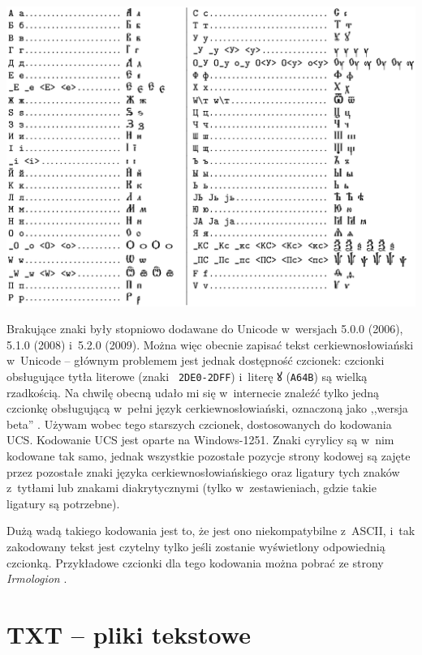 \documentclass{pracamgr}
\begin{document}
\begin{table}[ht!]
  \small
  \caption{Kodowanie znaków cerkiewno\-{}słowiańskich w~standardzie HIP}
  \centering
    \includegraphics[width=\textwidth]{HIP-tabelka.png}
    \label{tab:hip}
\end{table}

Brakujące znaki były stopniowo dodawane do Unicode w~wersjach 5.0.0
(2006), 5.1.0 (2008) i~5.2.0 (2009). Można więc obecnie zapisać tekst
cerkiewno\-{}słowiański w~Unicode -- głównym problemem jest jednak
dostępność czcionek: czcionki obsługujące tytła literowe (znaki {\tt
  2DE0-2DFF}) i~literę {\cyr ꙋ} ({\tt A64B}) są wielką rzadkością. Na
chwilę obecną udało mi się w~internecie znaleźć tylko jedną czcionkę
obsługującą w~pełni język cerkiewno\-{}słowiański, oznaczoną jako
,,wersja beta'' \cite{ponomar}. Używam wobec tego starszych czcionek,
dostosowanych do kodowania UCS. Kodowanie UCS jest oparte na
Windows-1251. Znaki cyrylicy są w~nim kodowane tak samo, jednak
wszystkie pozostałe pozycje strony kodowej są zajęte przez pozostałe
znaki języka cerkiewno\-{}słowiańskiego oraz ligatury tych znaków
z~tytłami lub znakami diakrytycznymi (tylko w~zestawieniach, gdzie takie
ligatury są potrzebne).

Dużą wadą takiego kodowania jest to, że jest ono niekompatybilne
z~ASCII, i~tak zakodowany tekst jest czytelny tylko jeśli zostanie
wyświetlony odpowiednią czcionką. Przykładowe czcionki dla tego
kodowania można pobrać ze strony \textit{Irmologion}
\cite{irmologion}.

\section{TXT -- pliki tekstowe}
\end{document}
